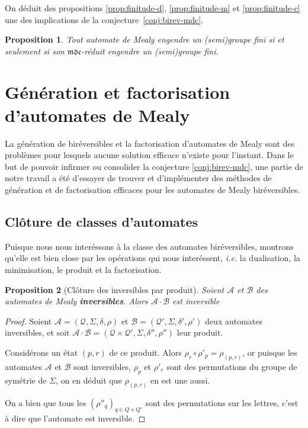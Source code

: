\documentclass[11pt,a4paper]{article}
\newtheorem{prop}{Proposition}
\begin{document}
On déduit des propositions \ref{prop:finitude-d}, \ref{prop:finitude-m} et \ref{prop:finitude-c} une des implications de la conjecture~\ref{conj:birev-mdc}.

\begin{prop}
  Tout automate de Mealy engendre un (semi)groupe fini si et seulement si son $\mathfrak{mdc}$-réduit engendre un (semi)groupe fini.
\end{prop}

\section{Génération et factorisation d'automates de Mealy}
La génération de biréversibles et la factorisation d'automates de Mealy sont des problèmes pour lesquels aucune solution efficace n'existe pour l'instant. Dans le but de pouvoir infirmer ou consolider la conjecture \ref{conj:birev-mdc}, une partie de notre travail a été d'essayer de trouver et d'implémenter des méthodes de génération et de factorisation efficaces pour les automates de Mealy biréversibles.


\subsection{Clôture de classes d'automates\label{sec:cloture}}

Puisque nous nous interéssons à la classe des automates biréversibles, montrons qu'elle est bien close par les opérations qui nous interéssent, \emph{i.e.} la dualisation, la minimisation, le produit et la factorisation.

\begin{prop}[Clôture des inversibles par produit]
  Soient $\mathcal{A}$ et $\mathcal{B}$ des automates de Mealy \textbf{inversibles}. Alors $\mathcal{A}\cdot\mathcal{B}$ est inversible
\end{prop}

\begin{proof}
  Soient $\mathcal{A}=\left(\mathcal{Q}, \Sigma, \delta, \rho\right)$ et $\mathcal{B}=\left(\mathcal{Q'}, \Sigma, \delta', \rho'\right)$ deux automates inversibles, et soit $\mathcal{A\cdot B}=\left(\mathcal{Q\times Q'}, \Sigma, \delta'', \rho''\right)$ leur produit.


  Considérons un état $(p, r)$ de ce produit. Alors $\rho_r\circ\rho'_p=\rho_{(p,r)}$, or puisque les automates $\mathcal{A}$ et $\mathcal{B}$ sont inversibles, $\rho_p$ et $\rho'_r$ sont des permutations du groupe de symétrie de $\Sigma$, on en déduit que $\rho_{(p, r)}$ en est une aussi.

  On a bien que tous les ${(\rho''_q)}_{q\in Q\times Q'}$ sont des permutations sur les lettres, c'est à dire que l'automate est inversible.
\end{proof}
\end{document}

